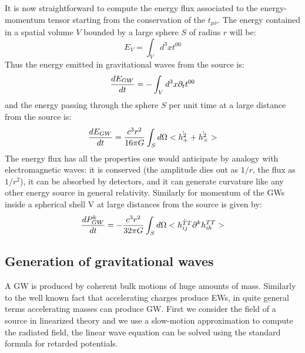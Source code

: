 \documentclass[binding=0.6cm, LaM]{sapthesis}
\begin{document}
It is now straightforward to compute the energy flux associated to the energy-momentum tensor starting from the conservation of the $t_{\mu\nu}$.
The energy contained in a spatial volume $V$ bounded by a large sphere $S$ of radius $r$ will be:
\begin{equation}
E_{V} = \int_{V} d^3x t^{00}
\end{equation}
Thus the energy emitted in gravitational waves from the source is: 
\begin{equation}
{{dE_{GW}}\over {dt}} = - \int_{V} d^3x \partial_t t^{00}
\end{equation}
and the energy passing through the sphere $S$ per unit time at a large distance from the source is:
\begin{equation}
{{dE_{GW}}\over {dt}} = {{c^3r^2}\over{16\pi G}}\int_{S} d\Omega<\dot{h_{+}^2}+\dot{h_{\times}^2}>
\end{equation}
The energy flux has all the properties one would anticipate by analogy with electromagnetic waves: it is conserved (the amplitude dies out as $1/r$, the flux as $1/r^2$), it can be absorbed by detectors, and it can generate curvature like any other energy source in general relativity. 
Similarly for momentum of the GWs inside a spherical shell V at large distances from the source is given by:
\begin{equation}
{{dP^{k}_{GW}}\over{dt}} = -{{c^3r^2}\over{32\pi G}}\int_{S}d\Omega<\dot{h_{ij}^{TT}}\partial^k{h_{ih}^{TT}}>
\end{equation}

 
\subsection{Generation of gravitational waves}
A GW is produced by coherent bulk motions of huge amounts of mass. 
Similarly to the well known fact that accelerating charges produce EWs, in quite general terms accelerating masses can produce GW.
First we consider the field of a source in linearized theory and we use a slow-motion approximation to compute the radiated field, the linear wave equation can be solved using the standard formula for retarded potentials. 
\end{document}
